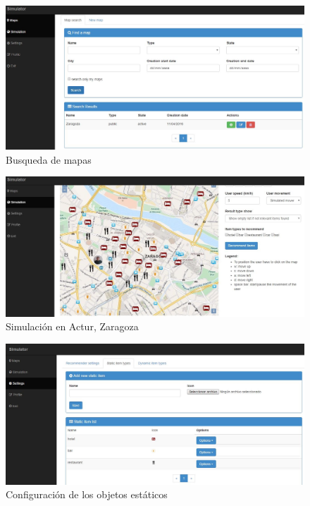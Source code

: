 \begin{figure}[H]
\centering\includegraphics[scale=0.3]{imagenes/busqueda-de-mapas.jpg}
\caption{Busqueda de mapas}
\label{BusquedaMapas}
\end{figure}

\begin{figure}[H]
\centering\includegraphics[scale=0.3]{imagenes/resumen-simulador.jpg}
\caption{Simulación en Actur, Zaragoza}
\label{simulacionActur}
\end{figure}

\begin{figure}[H]
\centering\includegraphics[scale=0.3]{imagenes/config-objetos-estaticos.jpg}
\caption{Configuración de los objetos estáticos}
\label{ConfigStaticItem}
\end{figure}